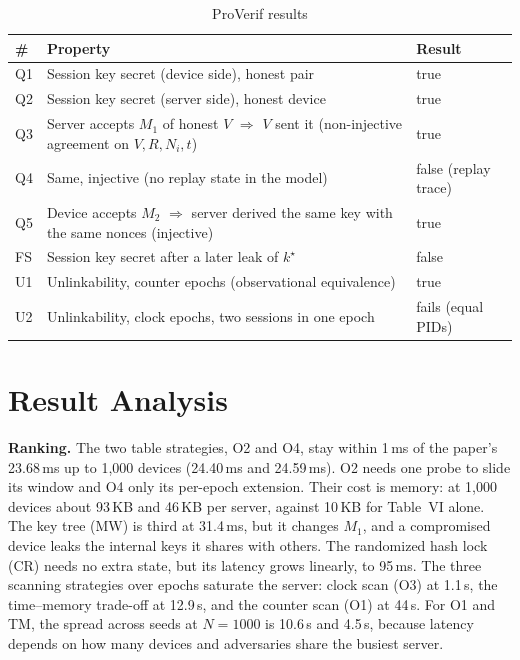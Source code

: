 \begin{table}[H]
\centering
\caption{ProVerif results}
\label{tab:fv}
\small
\renewcommand{\arraystretch}{1.15}
\begin{tabularx}{\textwidth}{|l|X|l|}
\hline
\textbf{\#} & \textbf{Property} & \textbf{Result}\\ \hline
Q1 & Session key secret (device side), honest pair & true\\ \hline
Q2 & Session key secret (server side), honest device & true\\ \hline
Q3 & Server accepts $M_1$ of honest $V$ $\Rightarrow$ $V$ sent it (non-injective agreement on $V,R,N_i,t$) & true\\ \hline
Q4 & Same, injective (no replay state in the model) & false (replay trace)\\ \hline
Q5 & Device accepts $M_2$ $\Rightarrow$ server derived the same key with the same nonces (injective) & true\\ \hline
FS & Session key secret after a later leak of $k^\star$ & false\\ \hline
U1 & Unlinkability, counter epochs (observational equivalence) & true\\ \hline
U2 & Unlinkability, clock epochs, two sessions in one epoch & fails (equal PIDs)\\ \hline
\end{tabularx}
\end{table}

\section{Result Analysis}
\textbf{Ranking.} The two table strategies, O2 and O4, stay within 1\,ms of the paper's 23.68\,ms up to 1,000 devices (24.40\,ms and 24.59\,ms). O2 needs one probe to slide its window and O4 only its per-epoch extension. Their cost is memory: at 1,000 devices about 93\,KB and 46\,KB per server, against 10\,KB for Table~VI alone. The key tree (MW) is third at 31.4\,ms, but it changes $M_1$, and a compromised device leaks the internal keys it shares with others. The randomized hash lock (CR) needs no extra state, but its latency grows linearly, to 95\,ms. The three scanning strategies over epochs saturate the server: clock scan (O3) at 1.1\,s, the time--memory trade-off at 12.9\,s, and the counter scan (O1) at 44\,s. For O1 and TM, the spread across seeds at $N=1000$ is 10.6\,s and 4.5\,s, because latency depends on how many devices and adversaries share the busiest server.

